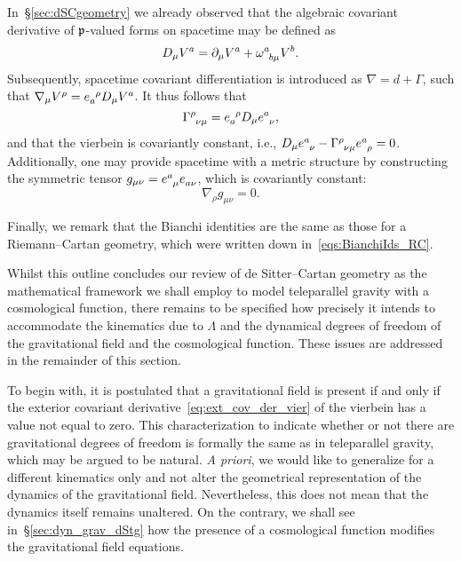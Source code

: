 \documentclass[
final,
11pt,
a4paper,
DIV=11,
headinclude=true,
footinclude=false,
bibliography=totoc,
twoside=true,  %
BCOR=5mm
]{scrbook}
\begin{document}
In~\S\ref{sec:dSCgeometry} we already observed that the algebraic 
covariant derivative of $\mathfrak{p}$-valued forms on spacetime may be 
defined as
\begin{equation}
\label{eq:covDerFullNonlin}
  D_\mu V^a = \pd_\mu V^a + \omega\ind{^a_{b\mu}} V^b.
\end{equation}
Subsequently, spacetime covariant differentiation is introduced 
as $\nabla = d + \Gamma$, such that $\nabla_\mu V^\rho 
= e\ind{_a^\rho} D_\mu V^a$. It thus follows that 
\begin{equation*}
  \Gamma\ind{^\rho_{\nu\mu}} = e\ind{_a^\rho} D_\mu 
  e\ind{^a_\nu},
\end{equation*}
and that the vierbein is covariantly constant, i.e., $D_\mu 
e\ind{^a_\nu} - \Gamma\ind{^\rho_{\nu\mu}} e\ind{^a_\rho} = 0$.
Additionally, one may provide spacetime with a metric structure 
by constructing the symmetric tensor $g_{\mu\nu} = e\ind{^a_\mu} 
e\ind{_{a\nu}}$, which is covariantly constant:
\begin{equation}
\label{eq:covDerivMetric}
  \nabla_\rho g_{\mu\nu} = 0.
\end{equation}

Finally, we remark that the Bianchi identities are the same as 
those for a Riemann--Cartan geometry, which were written down 
in~\eqref{eqs:BianchiIds_RC}.

\blankline%
\noindent%
Whilst this outline concludes our review of de Sitter--Cartan 
geometry as the mathematical framework we shall employ to model 
teleparallel gravity with a cosmological function, there remains 
to be specified how precisely it intends to accommodate the 
kinematics due to $\Lambda$ and the dynamical degrees of freedom 
of the gravitational field and the cosmological function. These 
issues are addressed in the remainder of this section.

To begin with, it is postulated that a gravitational field is 
present if and only if the exterior covariant 
derivative~\eqref{eq:ext_cov_der_vier} of the vierbein has 
a value not equal to zero. This characterization to indicate 
whether or not there are gravitational degrees of freedom is 
formally the same as in teleparallel gravity, which may be argued 
to be natural. \emph{A priori}, we would like to generalize for 
a different kinematics only and not alter the geometrical 
representation of the dynamics of the gravitational field.  
Nevertheless, this does not mean that the dynamics itself remains 
unaltered. On the contrary, we shall see 
in~\S\ref{sec:dyn_grav_dStg} how the presence of 
a cosmological function modifies the gravitational field 
equations.
\end{document}

